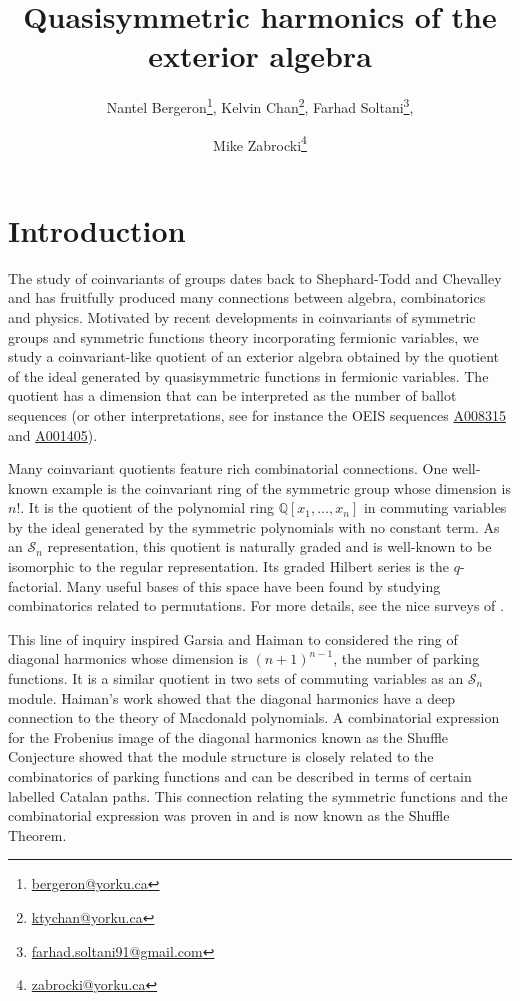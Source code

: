 \documentclass[submission]{FPSAC2023}
\title{Quasisymmetric harmonics of the exterior algebra}
\author{
Nantel Bergeron\thanks{\href{mailto:bergeron@yorku.ca}{bergeron@yorku.ca}}, 
Kelvin Chan\thanks{\href{mailto:ktychan@yorku.ca}{ktychan@yorku.ca}},
Farhad Soltani\thanks{\href{mailto:farhad.soltani91@gmail.com}{farhad.soltani91@gmail.com}}, \and
Mike Zabrocki\thanks{\href{mailto:zabrocki@yorku.ca}{zabrocki@yorku.ca}}
}
\theoremstyle{definition}
\numberwithin{equation}{section}
\begin{document}
\maketitle{}

\section{Introduction}
The study of coinvariants of groups dates back to Shephard-Todd and Chevalley~\cite{ST,Chevalley} and has fruitfully produced many connections between algebra, combinatorics and physics.  Motivated by recent developments in coinvariants of symmetric groups and symmetric functions theory incorporating fermionic variables, we study a coinvariant-like quotient of an exterior algebra obtained by the quotient of the ideal generated by quasisymmetric functions in fermionic variables.  The quotient has a dimension that can be interpreted as the number of ballot sequences (or other interpretations, see for instance the OEIS \cite{OEIS} sequences \href{https://oeis.org/A008315}{A008315} and \href{https://oeis.org/A001405}{A001405}).

Many coinvariant quotients feature rich combinatorial connections.  One well-known example is the coinvariant ring of the symmetric group whose dimension is $n!$.  It is the quotient of the polynomial ring $\mathbb{Q}[x_{1},\dots,x_{n}]$ in commuting variables by the ideal generated by the symmetric polynomials with no constant term.  As an $\mathcal{S}_{n}$ representation, this quotient is naturally graded and is well-known to be isomorphic to the regular representation.  Its graded Hilbert series is the $q$-factorial.  Many useful bases of this space have been found by studying combinatorics related to permutations.  For more details, see the nice surveys of \cite{B, GH, MacSchub, Manivel}.

This line of inquiry inspired Garsia and Haiman \cite{GH96,H} to considered the ring of diagonal harmonics whose dimension is $(n+1)^{n-1}$, the number of parking functions.  It is a similar quotient in two sets of commuting variables as an $\mathcal{S}_{n}$ module. Haiman's work \cite{H2} showed that the diagonal harmonics have a deep connection to the theory of Macdonald polynomials.  A combinatorial expression for the Frobenius image of the diagonal harmonics known as the Shuffle Conjecture \cite{HHLRU} showed that the module structure is closely related to the combinatorics of parking functions and can be described in terms of certain labelled Catalan paths.  This connection relating the symmetric functions and the combinatorial expression was proven in \cite{CM} and is now known as the Shuffle Theorem.
\end{document}
